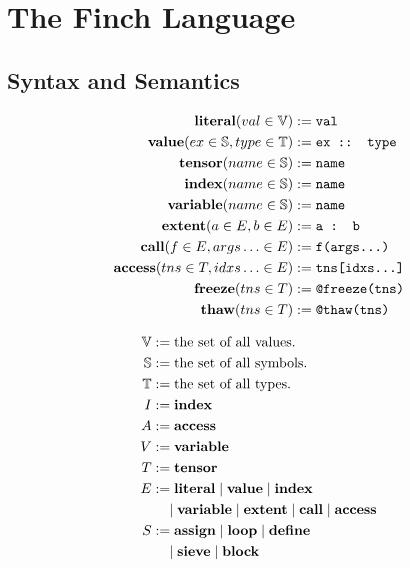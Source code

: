 
\section{The Finch Language}

\subsection{Syntax and Semantics}

\noindent %
\begin{minipage}{0.4\linewidth}
\begin{align*}
    \text{\textbf{literal}}(val \in \mathbb{V}) &:= \text{\texttt{val}} \\
    \text{\textbf{value}}(ex \in \mathbb{S}, type \in \mathbb{T}) &:= \text{\texttt{ex :: type}} \\
    \text{\textbf{tensor}}(name \in \mathbb{S}) &:= \text{\texttt{name}} \\
    \text{\textbf{index}}(name \in \mathbb{S}) &:= \text{\texttt{name}} \\
    \text{\textbf{variable}}(name \in \mathbb{S}) &:= \text{\texttt{name}} \\
    \text{\textbf{extent}}(a \in E, b \in E) &:= \text{\texttt{a : b}} \\
    \text{\textbf{call}}(f \in E, args\ldots \in E) &:= \text{\texttt{f(args...)}} \\
    \text{\textbf{access}}(tns \in T, idxs\ldots \in E) &:= \text{\texttt{tns[idxs...]}} \\
    \text{\textbf{freeze}}(tns \in T) &:= \text{\texttt{@freeze(tns)}} \\
    \text{\textbf{thaw}}(tns \in T) &:= \text{\texttt{@thaw(tns)}} \\
\end{align*}
\end{minipage}%
\begin{minipage}{0.5\linewidth}
\begin{align*}
    \mathbb{V} &:= \text{the set of all values.} \\
    \mathbb{S} &:= \text{the set of all symbols.} \\
    \mathbb{T} &:= \text{the set of all types.} \\
    I &:= \text{\textbf{index}} \\
    A &:= \text{\textbf{access}} \\
    V &:= \text{\textbf{variable}} \\
    T &:= \text{\textbf{tensor}} \\
    E &:= \text{\textbf{literal}} \mid \text{\textbf{value}} \mid \text{\textbf{index}} \\
        &\quad \mid \text{\textbf{variable}} \mid \text{\textbf{extent}} \mid \text{\textbf{call}} \mid \text{\textbf{access}} \\
    S &:= \text{\textbf{assign}} \mid \text{\textbf{loop}} \mid \text{\textbf{define}} \\
        &\quad \mid \text{\textbf{sieve}} \mid \text{\textbf{block}} \\
\end{align*}
\end{minipage}%
